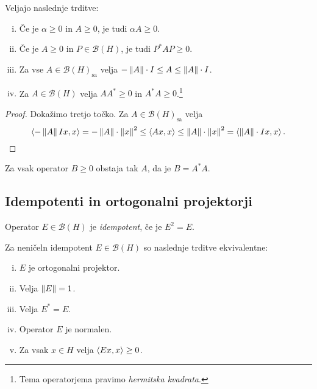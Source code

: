 \begin{trditev}
Veljajo naslednje trditve:

\begin{enumerate}[i)]
\item Če je $\alpha \geq 0$ in $A \geq 0$, je tudi
$\alpha A \geq 0$.
\item Če je $A \geq 0$ in $P \in \mathcal{B}(H)$, je tudi
$P^*AP \geq 0$.
\item Za vse $A \in \mathcal{B}(H)_{\text{sa}}$ velja
$-\left\lVert A\right\rVert \cdot I \leq A \leq \left\lVert A\right\rVert \cdot I$.
\item Za $A \in \mathcal{B}(H)$ velja $AA^* \geq 0$ in
$A^*A \geq 0$.\footnote{Tema operatorjema pravimo \emph{hermitska
kvadrata}.}
\end{enumerate}
\end{trditev}

\begin{proof}
Dokažimo tretjo točko. Za $A \in \mathcal{B}(H)_{\text{sa}}$ velja
\[
\left\langle -\left\lVert A\right\rVert Ix,x\right\rangle = -\left\lVert A\right\rVert \cdot \left\lVert x\right\rVert^2 \leq
\left\langle Ax,x\right\rangle \leq \left\lVert A\right\rVert \cdot \left\lVert x\right\rVert^2 =
\left\langle \left\lVert A\right\rVert \cdot I x, x\right\rangle. \qedhere
\]
\end{proof}

\begin{opomba}
Za vsak operator $B \geq 0$ obstaja tak $A$, da je $B = A^*A$.
\end{opomba}

\newpage

\subsection{Idempotenti in ortogonalni projektorji}

\begin{definicija}
Operator $E \in \mathcal{B}(H)$ je
\emph{idempotent}, če je $E^2 = E$.
\end{definicija}

\begin{trditev}
Za neničeln idempotent $E \in \mathcal{B}(H)$ so naslednje trditve
ekvivalentne:

\begin{enumerate}[i)]
\item $E$ je ortogonalni projektor.
\item Velja $\left\lVert E\right\rVert = 1$.
\item Velja $E^* = E$.
\item Operator $E$ je normalen.
\item Za vsak $x \in H$ velja $\left\langle Ex,x\right\rangle \geq 0$.
\end{enumerate}
\end{trditev}

